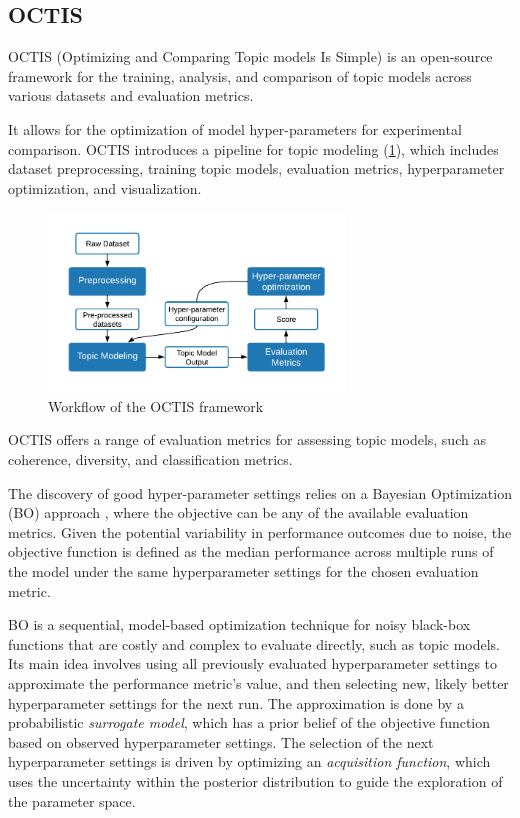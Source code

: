 \subsection{OCTIS}
\label{sec:octis}
OCTIS (Optimizing and Comparing Topic models Is Simple) \cite{terragni_octis_2021} is an open-source framework for the training, analysis, and comparison of topic models across various datasets and evaluation metrics.

It allows for the optimization of model hyper-parameters for experimental comparison. OCTIS introduces a pipeline for topic modeling (\cref{fig:octis}), which includes dataset preprocessing, training topic models, evaluation metrics, hyperparameter optimization, and visualization.

\begin{figure}[h] %
    \centering
    \includegraphics[width=0.7\textwidth]{figures/octis.pdf}
    \caption{Workflow of the OCTIS framework}
    \label{fig:octis}
\end{figure}

OCTIS offers a range of evaluation metrics for assessing topic models, such as coherence, diversity, and classification metrics.

The discovery of good hyper-parameter settings relies on a Bayesian Optimization (BO) approach \cite{archetti_bayesian_2019, galuzzi_hyperparameter_2020, snoek_practical_2012}, where the objective can be any of the available evaluation metrics. Given the potential variability in performance outcomes due to noise, the objective function is defined as the median performance across multiple runs of the model under the same hyperparameter settings for the chosen evaluation metric.

BO is a sequential, model-based optimization technique for noisy black-box functions that are costly and complex to evaluate directly, such as topic models. Its main idea involves using all previously evaluated hyperparameter settings to approximate the performance metric's value, and then selecting new, likely better hyperparameter settings for the next run. The approximation is done by a probabilistic \textit{surrogate model}, which has a prior belief of the objective function based on observed hyperparameter settings. The selection of the next hyperparameter settings is driven by optimizing an \textit{acquisition function}, which uses the uncertainty within the posterior distribution to guide the exploration of the parameter space.

